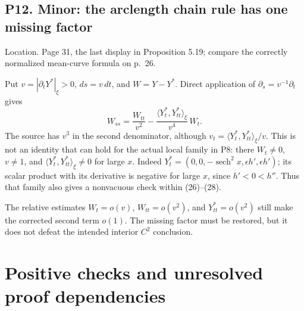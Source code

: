 \documentclass[10pt]{article}
\begin{document}
\subsection*{P12. Minor: the arclength chain rule has one missing factor}
Location. Page 31, the last display in Proposition 5.19; compare the correctly normalized mean-curve formula on p. 26.\par
Put \(v=|\partial_tY^*|_\xi>0\), \(ds=v\,dt\), and \(W=Y-Y^*\). Direct application of \(\partial_s=v^{-1}\partial_t\) gives \[W_{ss}=\frac{W_{tt}}{v^2}
       -\frac{\langle Y_t^*,Y_{tt}^*\rangle_\xi}{v^4}\,W_t .
 \tag{P12.1}\] The source has \(v^3\) in the second denominator, although \(v_t=\langle Y_t^*,Y_{tt}^*\rangle_\xi/v\). This is not an identity that can hold for the actual local family in P8: there \(W_t\ne0\), \(v\ne1\), and \(\langle Y_t^*,Y_{tt}^*\rangle_\xi\ne0\) for large \(x\). Indeed \(Y_t^*=(0,0,-\operatorname{sech}^2x,
\epsilon h',\epsilon h')\); its scalar product with its derivative is negative for large \(x\), since \(h'<0<h''\). Thus that family also gives a nonvacuous check within (26)–(28).\par
The relative estimates \(W_t=o(v)\), \(W_{tt}=o(v^2)\), and \(Y_{tt}^*=o(v^2)\) still make the corrected second term \(o(1)\). The missing factor must be restored, but it does not defeat the intended interior \(C^2\) conclusion.\par
\section*{Positive checks and unresolved proof dependencies}
\end{document}
